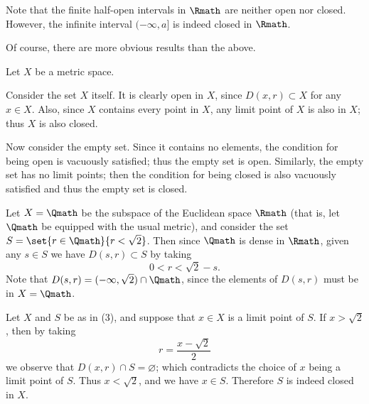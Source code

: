 \begin{example}
\begin{nlist}
        \item Note that
        the finite half-open intervals in \(\Rmath\) are
        neither open nor closed.
        However, the infinite interval \((-\infty,a]\) is indeed
        closed in \(\Rmath\).
    \end{nlist}
\end{example}

Of course,
there are more obvious results than the above.

\begin{example}
    \label{exm:opcl2}
    Let \(X\) be a metric space.
    \begin{nlist}
        \item Consider the set \(X\) itself.
        It is clearly open in \(X\),
        since \(D(x,r)\subset X\) for any \(x\in X\).
        Also, since \(X\) contains every point in \(X\),
        any limit point of \(X\) is also in \(X\);
        thus \(X\) is also closed.

        \item Now consider the empty set.
        Since it contains no elements,
        the condition for being open is vacuously satisfied;
        thus the empty set is open.
        Similarly, the empty set has no limit points;
        then the condition for being closed is also vacuously satisfied
        and thus the empty set is closed.

        \item Let \(X=\Qmath\) be the subspace
        of the Euclidean space \(\Rmath\)
        (that is, let \(\Qmath\) be equipped with the usual metric),
        and consider the set \(S=\set{r\in\Qmath}{r<\sqrt 2}\).
        Then since \(\Qmath\) is dense in \(\Rmath\),
        given any \(s\in S\) we have \(D(s,r)\subset S\) by taking
        \[
            0<r<\sqrt 2-s.
        \]
        Note that \(D(s,r)=(-\infty,\sqrt 2)\cap\Qmath\),
        since the elements of \(D(s,r)\) must be in \(X=\Qmath\).

        \item Let \(X\) and \(S\) be as in (3),
        and suppose that \(x\in X\) is a limit point of \(S\).
        If \(x>\sqrt{2}\),
        then by taking
        \[
            r=\frac{x-\sqrt{2}}{2}
        \]
        we observe that \(D(x,r)\cap S=\varnothing\);
        which contradicts the choice of \(x\)
        being a limit point of \(S\).
        Thus \(x<\sqrt 2\), and we have \(x\in S\).
        Therefore \(S\) is indeed closed in \(X\).
    \end{nlist}
\end{example}

